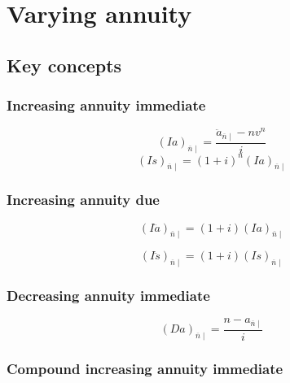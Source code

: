 \documentclass[
]{book}
\begin{document}
\hypertarget{varying-annuity}{%
\chapter{Varying annuity}\label{varying-annuity}}

\hypertarget{key-concepts}{%
\section{Key concepts}\label{key-concepts}}

\hypertarget{increasing-annuity-immediate}{%
\subsection*{Increasing annuity immediate}\label{increasing-annuity-immediate}}

\[(Ia)_{\overline{n}\mid}=\frac{\ddot{a}_{\overline{n}\mid}-nv^n}{i}\]
\[(Is)_{\overline{n}\mid}=(1+i)^n(Ia)_{\overline{n}\mid}\]

\hypertarget{increasing-annuity-due}{%
\subsection*{Increasing annuity due}\label{increasing-annuity-due}}

\[(I\ddot{a})_{\overline{n}\mid}=(1+i)(Ia)_{\overline{n}\mid}\]

\[(I\ddot{s})_{\overline{n}\mid}=(1+i)(Is)_{\overline{n}\mid}\]

\hypertarget{decreasing-annuity-immediate}{%
\subsection*{Decreasing annuity immediate}\label{decreasing-annuity-immediate}}

\[(Da)_{\overline{n}\mid}=\frac{n-a_{\overline{n}\mid}}{i}\]

\hypertarget{compound-increasing-annuity-immediate}{%
\subsection*{Compound increasing annuity immediate}\label{compound-increasing-annuity-immediate}}
\end{document}
